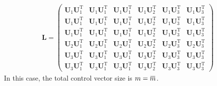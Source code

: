 \documentclass[12pt]{scrartcl}
\newcommand{\overbar}[1]{\mkern 1.5mu\overline{\mkern-1.5mu#1\mkern-1.5mu}\mkern 1.5mu}
\begin{document}
\begin{align}
\mathbf{L} = \left( \begin{array}{ccc|c|cc}
\mathbf{U}_1 \mathbf{U}_1^\mathrm{T} & \mathbf{U}_1 \mathbf{U}_1^\mathrm{T} & \mathbf{U}_1 \mathbf{U}_1^\mathrm{T} & \mathbf{U}_1 \mathbf{U}_2^\mathrm{T} & \mathbf{U}_1 \mathbf{U}_3^\mathrm{T} & \mathbf{U}_1 \mathbf{U}_3^\mathrm{T} \\
\mathbf{U}_1 \mathbf{U}_1^\mathrm{T} & \mathbf{U}_1 \mathbf{U}_1^\mathrm{T} & \mathbf{U}_1 \mathbf{U}_1^\mathrm{T} & \mathbf{U}_1 \mathbf{U}_2^\mathrm{T} & \mathbf{U}_1 \mathbf{U}_3^\mathrm{T} & \mathbf{U}_1 \mathbf{U}_3^\mathrm{T} \\
\mathbf{U}_1 \mathbf{U}_1^\mathrm{T} & \mathbf{U}_1 \mathbf{U}_1^\mathrm{T} & \mathbf{U}_1 \mathbf{U}_1^\mathrm{T} & \mathbf{U}_1 \mathbf{U}_2^\mathrm{T} & \mathbf{U}_1 \mathbf{U}_3^\mathrm{T} & \mathbf{U}_1 \mathbf{U}_3^\mathrm{T} \\[0.3ex]
\hline
\mathbf{U}_2 \mathbf{U}_1^\mathrm{T} & \mathbf{U}_2 \mathbf{U}_1^\mathrm{T} & \mathbf{U}_2 \mathbf{U}_1^\mathrm{T} & \mathbf{U}_2 \mathbf{U}_2^\mathrm{T} & \mathbf{U}_2 \mathbf{U}_3^\mathrm{T} & \mathbf{U}_2 \mathbf{U}_3^\mathrm{T} \\[0.3ex]
\hline
\mathbf{U}_3 \mathbf{U}_1^\mathrm{T} & \mathbf{U}_3 \mathbf{U}_1^\mathrm{T} & \mathbf{U}_3 \mathbf{U}_1^\mathrm{T} & \mathbf{U}_3 \mathbf{U}_2^\mathrm{T} & \mathbf{U}_3 \mathbf{U}_3^\mathrm{T} & \mathbf{U}_3 \mathbf{U}_3^\mathrm{T} \\
\mathbf{U}_3 \mathbf{U}_1^\mathrm{T} & \mathbf{U}_3 \mathbf{U}_1^\mathrm{T} & \mathbf{U}_3 \mathbf{U}_1^\mathrm{T} & \mathbf{U}_3 \mathbf{U}_2^\mathrm{T} & \mathbf{U}_3 \mathbf{U}_3^\mathrm{T} & \mathbf{U}_3 \mathbf{U}_3^\mathrm{T}
\end{array} \right)
\end{align}
In this case, the total control vector size is $\displaystyle m = \overbar{m}$.
\end{document}
